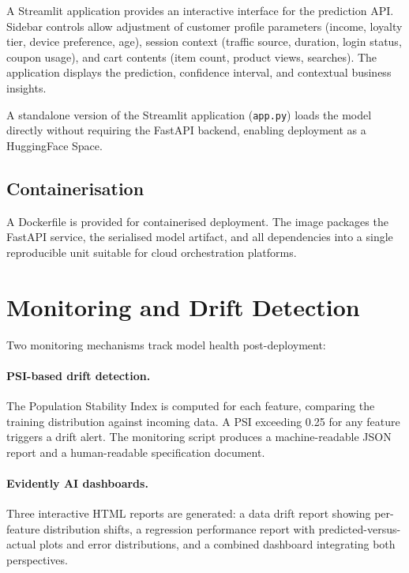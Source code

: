 \documentclass[11pt,a4paper]{article}
\begin{document}
A Streamlit application provides an interactive interface for the prediction
API.  Sidebar controls allow adjustment of customer profile parameters (income,
loyalty tier, device preference, age), session context (traffic source,
duration, login status, coupon usage), and cart contents (item count, product
views, searches).  The application displays the prediction, confidence
interval, and contextual business insights.

A standalone version of the Streamlit application (\texttt{app.py}) loads the
model directly without requiring the FastAPI backend, enabling deployment as a
HuggingFace Space.

\subsection{Containerisation}

A Dockerfile is provided for containerised deployment.  The image packages the
FastAPI service, the serialised model artifact, and all dependencies into a
single reproducible unit suitable for cloud orchestration platforms.

\section{Monitoring and Drift Detection}
\label{sec:monitoring}

Two monitoring mechanisms track model health post-deployment:

\paragraph{PSI-based drift detection.}
The Population Stability Index is computed for each feature, comparing the
training distribution against incoming data.  A PSI exceeding 0.25 for any
feature triggers a drift alert.  The monitoring script produces a
machine-readable JSON report and a human-readable specification document.

\paragraph{Evidently AI dashboards.}
Three interactive HTML reports are generated: a data drift report showing
per-feature distribution shifts, a regression performance report with
predicted-versus-actual plots and error distributions, and a combined dashboard
integrating both perspectives.
\end{document}
